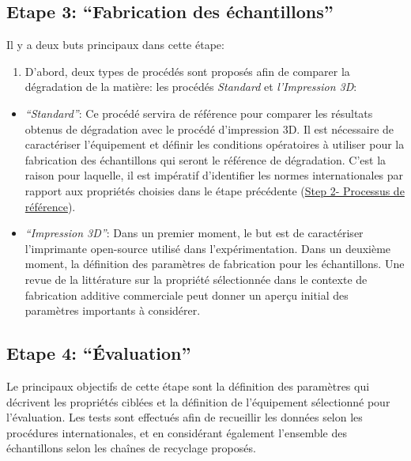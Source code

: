 \documentclass[
]{article}
\providecommand{\tightlist}{%
  \setlength{\itemsep}{0pt}\setlength{\parskip}{0pt}}
\begin{document}
\hypertarget{Step3}{%
\subsection{Etape 3: ``Fabrication des échantillons''}\label{Step3}}

Il y a deux buts principaux dans cette étape:

\begin{enumerate}
\def\labelenumi{\arabic{enumi}.}
\tightlist
\item
  D'abord, deux types de procédés sont proposés afin de comparer la
  dégradation de la matière: les procédés \emph{Standard} et
  \emph{l'Impression 3D}:
\end{enumerate}

\begin{itemize}
\item
  \emph{``Standard''}: Ce procédé servira de référence pour comparer les
  résultats obtenus de dégradation avec le procédé d'impression 3D. Il
  est nécessaire de caractériser l'équipement et définir les conditions
  opératoires à utiliser pour la fabrication des échantillons qui seront
  le référence de dégradation. C'est la raison pour laquelle, il est
  impératif d'identifier les normes internationales par rapport aux
  propriétés choisies dans le étape précédente
  (\protect\hyperlink{Step2}{Step 2- Processus de référence}).
\item
  \emph{``Impression 3D''}: Dans un premier moment, le but est de
  caractériser l'imprimante open-source utilisé dans l'expérimentation.
  Dans un deuxième moment, la définition des paramètres de fabrication
  pour les échantillons. Une revue de la littérature sur la propriété
  sélectionnée dans le contexte de fabrication additive commerciale peut
  donner un aperçu initial des paramètres importants à considérer.
\end{itemize}

\hypertarget{Step4}{%
\subsection{Etape 4: ``Évaluation''}\label{Step4}}

Le principaux objectifs de cette étape sont la définition des paramètres
qui décrivent les propriétés ciblées et la définition de l'équipement
sélectionné pour l'évaluation. Les tests sont effectués afin de
recueillir les données selon les procédures internationales, et en
considérant également l'ensemble des échantillons selon les chaînes de
recyclage proposés.
\end{document}
